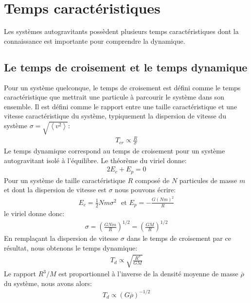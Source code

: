 \section{Temps caractéristiques\label{chap_trelax}}

Les systèmes autogravitants possèdent plusieurs temps caractéristiques dont la connaissance est importante pour comprendre la dynamique.

\subsection{Le temps de croisement et le temps dynamique}

Pour un système quelconque, le temps de croisement est défini comme le temps caractéristique que mettrait une particule à parcourir le système dans son ensemble. Il est défini
comme le rapport entre une taille caractéristique et une vitesse caractéristique du système, typiquement la dispersion de vitesse du système $\sigma=\sqrt{\left\langle v^2\right\rangle}$:
\begin{align*}
	T_{cr}\propto\frac{R}{\sigma}%
\end{align*}
Le temps dynamique correspond au temps de croisement pour un système autogravitant isolé à l'équilibre. Le théorème du viriel donne:
\begin{align*}
	2E_{c}+E_{p}=0
\end{align*}
Pour un système de taille caractéristique $R$ composé de $N$ particules de masse $m$ et dont la dispersion de vitesse est $\sigma$ nous pouvons écrire:
\begin{align*}
	E_{c}=\frac{1}{2}Nm\sigma^{2}\ \ \ \text{et\ \ \ }E_{p}=-\frac{G\left(Nm\right)^{2}}{R}%
\end{align*}
le viriel donne donc:
\begin{align*}
	\sigma=\left(  \frac{GNm}{R}\right)  ^{1/2}=\left(  \frac{GM}{R}\right) ^{1/2}%
\end{align*}
En remplaçant la dispersion de vitesse $\sigma$ dans le temps de croisement par ce résultat, nous obtenons le temps dynamique:
\begin{align*}
	T_{d}\propto\sqrt{\frac{R^{3}}{GM}}%
\end{align*}
Le rapport $R^{3}/M$ est proportionnel à l'inverse de la densité moyenne de masse $\overline{\rho}$ du système, nous avons alors:
\begin{align}
	T_{d}\propto\left(  G\overline{\rho}\right)  ^{-1/2} \label{def:T-dyn_tcr} %
\end{align}

